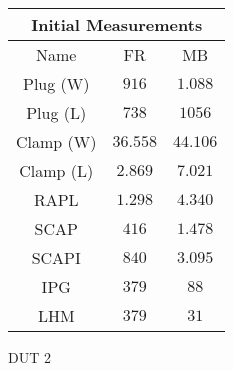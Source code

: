     \centering
    \begin{tabular}{|| c | c | c ||}
    \hline
    \multicolumn{3}{||c||}{Initial Measurements} \\ [0.5ex] \hline\hline
    Name & FR & MB \\\hline
    Plug (W) & $916$ & $1.088$ \\
    Plug (L) & $738$ & $1056$ \\
    Clamp (W) & $36.558$ & $44.106$ \\
    Clamp (L) & $2.869$ & $7.021$ \\
    RAPL & $1.298$ & $4.340$ \\
    SCAP & $416$ & $1.478$ \\
    SCAPI & $840$ & $3.095$ \\
    IPG & $379$ & $88$ \\
    LHM & $379$ & $31$ \\\hline
    \end{tabular}
    \caption{DUT 2}
    \label{tab:initial-measurements-exp-2-dut-2}
